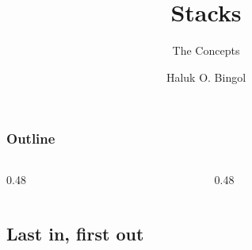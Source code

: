 \documentclass[aspectratio=169,10pt,compress]{beamer}
\title{Stacks}
\subtitle{The Concepts}
\author[Bingol]{Haluk O. Bingol}
\institute[FCIS]{
    Faculty of Computer and Information Sciences\\
    Yeditepe University
}
\date{
	{\tiny \hbTimeStamp}
}
\begin{document}
\begin{frame}[t,fragile]
  \titlepage
\end{frame}




\begin{frame}[t,fragile] \frametitle{Outline}
  \begin{columns}[T]
    \begin{column}{0.48\textwidth}
      \tableofcontents[sections={1-4}, hideallsubsections]
    \end{column}
    \begin{column}{0.48\textwidth}
      \tableofcontents[sections={5-8}, hideallsubsections]
    \end{column}
  \end{columns}
\end{frame}


\subsection[LIFO]{Last in, first out}
\end{document}
